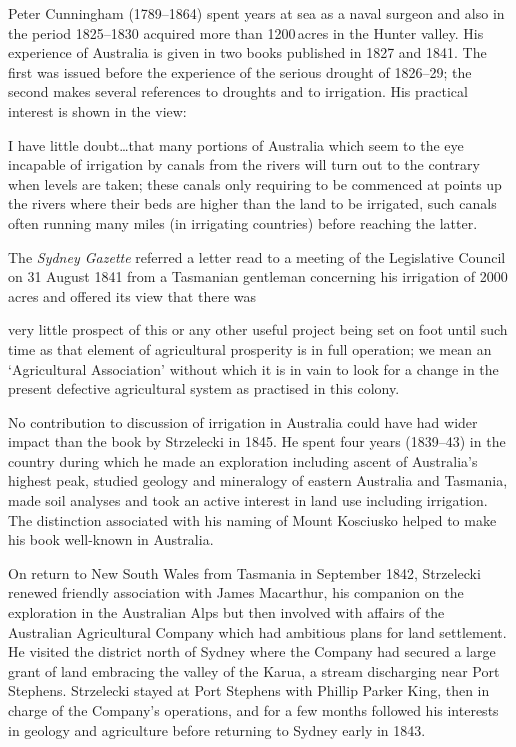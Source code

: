 Peter Cunningham (1789--1864)  spent years at
sea as a naval surgeon and also in the period 1825--1830 acquired more
than 1200\,acres in the Hunter valley.  His experience of Australia is
given in two books published in 1827 and 1841.  The first was issued
before the experience of the serious drought of
1826--29; the second makes several references to droughts and to
irrigation. His practical interest is shown in the view:
\begin{Quote}
	I have little doubt\ldots that many portions of Australia
	which seem to the eye incapable of irrigation by
	canals from the rivers will
	turn out to the contrary when levels are taken; these canals
	only requiring to be commenced at points up the rivers where
	their beds are higher than the land to be irrigated, such
	canals often running many miles (in irrigating countries)
	before reaching the latter.
\end{Quote}

The \textit{Sydney Gazette} referred a letter read to a meeting of the
Legislative Council on 31 August 1841 from a Tasmanian gentleman
concerning his irrigation of 2000\,acres and offered its view that
there was
\begin{Quote}
	very little prospect of this or any other useful project being
	set on foot until such time as that element of agricultural
	prosperity is in full operation; we mean an `Agricultural
	Association' without which it is in vain to look for a change
	in the present defective agricultural system as practised in
	this colony.
\end{Quote}

No contribution to discussion of irrigation in Australia could have
had wider impact than the book by Strzelecki  in
1845.  He spent four years (1839--43) in the country during which he
made an exploration including ascent of Australia's highest peak,
studied geology and mineralogy of eastern Australia and Tasmania, made
soil analyses and took an active interest in land use including
irrigation.  The distinction associated with his naming of Mount
Kosciusko  helped to make his book
well-known in Australia.

On return to New South Wales from Tasmania in September 1842,
Strzelecki renewed friendly association with James Macarthur,
 his companion on the exploration in the
Australian Alps but then involved with affairs of the Australian
Agricultural Company  which had
ambitious plans for land settlement.  He visited the district north of
Sydney where the Company had secured a large grant of land embracing
the valley of the Karua, a stream discharging near Port Stephens.
 Strzelecki stayed at Port Stephens with
Phillip Parker King,   then in charge of the
Company's operations, and for a few months followed his interests in
geology and agriculture before returning to Sydney early in
1843.

